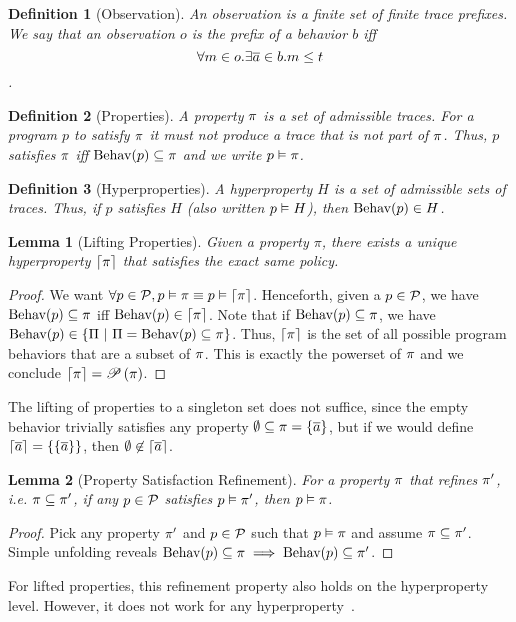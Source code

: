 \documentclass[a4paper,names,dvipsnames]{article}
\newtheorem{definition}{Definition}
\newtheorem{lemma}{Lemma}
\begin{document}
\begin{definition}[Observation]
  An observation is a finite set of finite trace prefixes.
  We say that an observation $o$ is the prefix of a behavior $b$ iff $$\forall m\in o.\exists \overline{a}\in b.m\le t$$.
\end{definition}

\begin{definition}[Properties]
  A property $\pi$ is a set of admissible traces. For a program $p$ to satisfy $\pi$ it must not produce a trace that is not part of $\pi$. Thus, $p$ satisfies $\pi$ iff $\text{Behav}({p})\subseteq\pi$ and we write ${p}\vDash{\pi}$.
\end{definition}

\begin{definition}[Hyperproperties]
  A hyperproperty $H$ is a set of admissible sets of traces. Thus, if $p$ satisfies $H$ (also written ${p}\vDash{H}$), then $\text{Behav}({p})\in H$.
\end{definition}

\begin{lemma}[Lifting Properties]
  Given a property $\pi$, there exists a unique hyperproperty $\left\lceil{\pi}\right\rceil$ that satisfies the exact same policy.
\end{lemma}
\begin{proof}
  We want $\forall p \in\mathcal{P}, {p}\vDash{\pi}\equiv{p}\vDash{\left\lceil{\pi}\right\rceil}$.
  Henceforth, given a $p\in\mathcal{P}$, we have $\text{Behav}({p})\subseteq\pi$ iff $\text{Behav}({p})\in\left\lceil{\pi}\right\rceil$.
  Note that if $\text{Behav}({p})\subseteq\pi$, we have $\behav{p}\in\left\{\Pi\ |\ \Pi=\behav{p}\subseteq\prop\right\}$.
  Thus, $\left\lceil{\pi}\right\rceil$ is the set of all possible program behaviors that are a subset of $\pi$.
  This is exactly the powerset of $\pi$ and we conclude $\left\lceil{\pi}\right\rceil=\mathscr{P}\left({\pi}\right)$.
\end{proof}
\noindent
The lifting of properties to a singleton set does not suffice, since the empty behavior trivially satisfies any property $\emptyset\subseteq\pi=\{\overline{a}\}$, but if we would define $\left\lceil{\overline{a}}\right\rceil=\{\{\overline{a}\}\}$, then $\emptyset\not\in\left\lceil{\overline{a}}\right\rceil$.

\begin{lemma}[Property Satisfaction Refinement]
  For a property $\pi$ that refines $\pi'$, i.e. $\pi\subseteq\pi'$, if any $p\in\mathcal{P}$ satisfies ${p}\vDash{\pi'}$, then ${p}\vDash{\pi}$.
\end{lemma}
\begin{proof}
  Pick any property $\pi'$ and $p\in\mathcal{P}$ such that ${p}\vDash{\pi}$ and assume $\pi\subseteq\pi'$.
  Simple unfolding reveals $\text{Behav}({p})\subseteq\pi\implies\text{Behav}({p})\subseteq\pi'$.
\end{proof}
\noindent
For lifted properties, this refinement property also holds on the hyperproperty level.
However, it does not work for any hyperproperty~\cite{clarkson08}.
\end{document}
